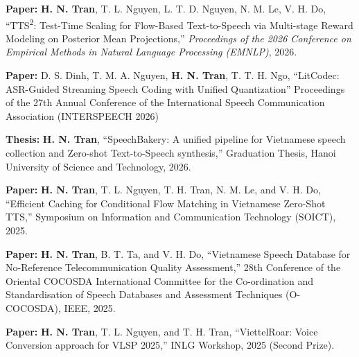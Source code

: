 

\begin{cvparagraph}

\textbf{Paper:} \textbf{H. N. Tran}, T. L. Nguyen, L. T. D. Nguyen, N. M. Le, V. H. Do,
``TTS\textsuperscript{2}: Test-Time Scaling for Flow-Based Text-to-Speech via Multi-stage Reward Modeling on Posterior Mean Projections,''
\textit{Proceedings of the 2026 Conference on Empirical Methods in Natural Language Processing (EMNLP)}, 2026.

\textbf{Paper:} D. S. Dinh, T. M. A. Nguyen, \textbf{H. N. Tran}, T. T. H. Ngo, “LitCodec: ASR-Guided Streaming Speech Coding with Unified Quantization” Proceedings of the 27th Annual Conference of the International Speech Communication Association (INTERSPEECH 2026)

\textbf{Thesis:} \textbf{H. N. Tran}, “SpeechBakery: A unified pipeline for Vietnamese speech collection and Zero-shot Text-to-Speech synthesis,” Graduation Thesis, Hanoi University of Science and Technology, 2026.

\textbf{Paper:} \textbf{H. N. Tran}, T. L. Nguyen, T. H. Tran, N. M. Le, and V. H. Do, “Efficient Caching for Conditional Flow Matching in Vietnamese Zero-Shot TTS,” Symposium on Information and Communication Technology (SOICT), 2025.

\textbf{Paper:} \textbf{H. N. Tran}, B. T. Ta, and V. H. Do, “Vietnamese Speech Database for No-Reference Telecommunication Quality Assessment,” 28th Conference of the Oriental COCOSDA International Committee for the Co-ordination and Standardisation of Speech Databases and Assessment Techniques (O-COCOSDA), IEEE, 2025.

\textbf{Paper:} \textbf{H. N. Tran}, T. L. Nguyen, and T. H. Tran, “ViettelRoar: Voice Conversion approach for VLSP 2025,” INLG Workshop, 2025 (Second Prize).

\end{cvparagraph}
